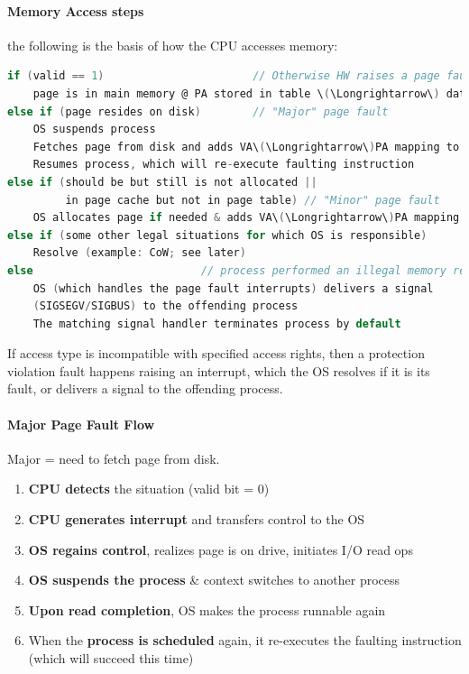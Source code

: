 \documentclass[openany,12pt]{book}
\begin{document}
\paragraph{Memory Access steps} the following is the basis of how the CPU accesses memory:
\begin{lstlisting}[language=C, caption={Memory Access Steps in Virtual Memory}, label={lst:memory_access}]
if (valid == 1)                       // Otherwise HW raises a page fault interrupt
    page is in main memory @ PA stored in table \(\Longrightarrow\) data can be used
else if (page resides on disk)        // "Major" page fault
    OS suspends process
    Fetches page from disk and adds VA\(\Longrightarrow\)PA mapping to page table
    Resumes process, which will re-execute faulting instruction
else if (should be but still is not allocated ||
         in page cache but not in page table) // "Minor" page fault
    OS allocates page if needed & adds VA\(\Longrightarrow\)PA mapping to page table
else if (some other legal situations for which OS is responsible)
    Resolve (example: CoW; see later)
else                          // process performed an illegal memory ref
    OS (which handles the page fault interrupts) delivers a signal
    (SIGSEGV/SIGBUS) to the offending process
    The matching signal handler terminates process by default
\end{lstlisting}

If access type is incompatible with specified access rights, then a protection violation fault happens raising an interrupt, which the OS resolves if it is its fault, or delivers a signal to the offending process.


\paragraph{Major Page Fault Flow} Major = need to fetch page from disk.
\begin{enumerate}
  \item \textbf{CPU detects} the situation (valid bit = 0)
  \item \textbf{CPU generates interrupt} and transfers control to the OS
  \item \textbf{OS regains control}, realizes page is on drive, initiates I/O read ops
  \item \textbf{OS suspends the process} \& context switches to another process
  \item \textbf{Upon read completion}, OS makes the process runnable again
  \item When the \textbf{process is scheduled} again, it re-executes the faulting instruction (which will succeed this time)
\end{enumerate}
\end{document}
